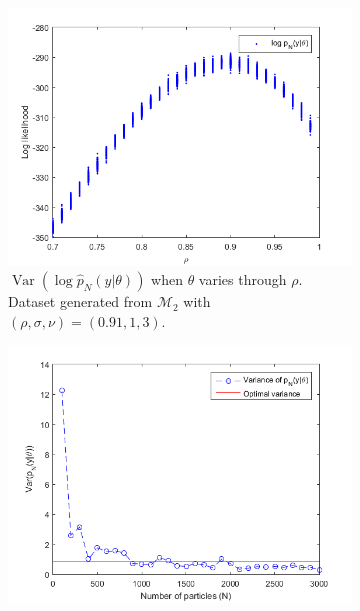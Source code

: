 \documentclass[11pt,a4,twosided,singlespacing,titlepagenumber=on]{scrreprt}
\numberwithin{equation}{chapter} %
\theoremstyle{remark}
\DeclareMathOperator{\var}{Var}
\begin{document}
\begin{figure}[H]
    \centering
    \begin{subfigure}[t]{0.49\textwidth}
        \centering
        \includegraphics[width=1\textwidth]{tuning_n_rho_varying}
        \caption{$\var(\log \hat{p}_N(y|\theta))$ when $\theta$ varies through $\rho$. Dataset generated from $\mathcal{M}_2$ with $(\rho,\sigma,\nu) = (0.91,1,3)$.}
        \label{tuning_n_rho_varying}
    \end{subfigure}
    \begin{subfigure}[t]{0.49\textwidth}
        \centering
        \includegraphics[width=1\textwidth]{tuning_n_optimal_var}

\end{subfigure}
\end{figure}
\end{document}
